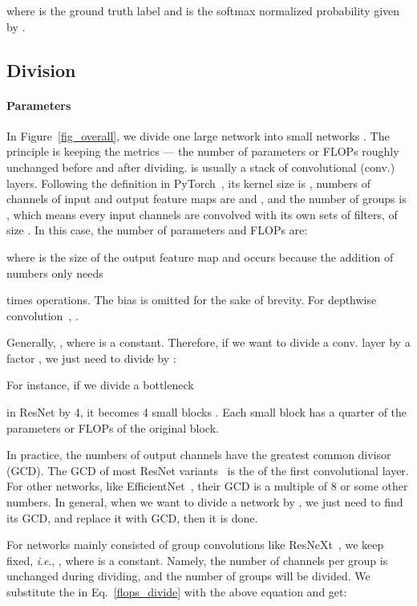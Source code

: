 \documentclass[lettersize,journal]{IEEEtran}
\newcommand{\ie}{\textit{i}.\textit{e}.}
\begin{document}
where  is the ground truth label and
 is the softmax normalized probability given by .


\subsection{Division} \label{sec_divide}
\paragraph{Parameters}
In Figure~\ref{fig_overall},
we divide one large network  
into  small networks .
The principle is keeping the metrics ---
the number of parameters or FLOPs roughly
unchanged before and after dividing.
 is usually a stack of convolutional (conv.) layers.
Following the definition in PyTorch~\cite{NEURIPS2019_PyTorch},
its kernel size is , numbers of channels of input and output feature maps are
 and , and the number of groups is , which means every
 input channels are convolved with its own sets of filters,
of size . In this case, the number of parameters and FLOPs are:
 
where  is the size of the output feature map and  occurs because 
the addition of  numbers only needs

times operations. The bias is omitted for the sake of brevity.
For depthwise convolution~\cite{2018_mobilenetv2}, .

Generally, , where  is a constant.
Therefore, if we want to divide a conv. layer by a factor ,
we just need to divide  by :   
 
For instance, if we divide a bottleneck

in ResNet by 4, it becomes 4 small blocks
.
Each small block has a quarter of the parameters or FLOPs
of the original block.


In practice, the numbers of output channels have the greatest common divisor (GCD).
The GCD of most ResNet
variants~\cite{2016_ResNet,2016_WRN,2017_ResNeXt,2018_CVPR_SENet} is the  of
the first convolutional layer.
For other networks, like EfficientNet~\cite{2019_EfficientNet}, their GCD is a 
multiple of 8 or some other numbers.
In general, when we want to divide a network by , we just need to find its GCD, 
and replace it with GCD, then it is done.

For networks mainly consisted of group convolutions like ResNeXt~\cite{2017_ResNeXt},
we keep  fixed, \ie, ,
where  is a constant.
Namely, the number of channels per group is unchanged during dividing,
and the number of groups will be divided.
We substitute the  in Eq.~\eqref{flops_divide} with the above
equation and get:
\end{document}
